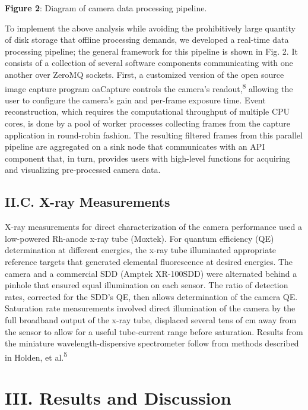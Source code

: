 \textbf{Figure 2}: Diagram of camera data processing pipeline.
\bigbreak


To implement the above analysis while avoiding the prohibitively large
quantity of disk storage that offline processing demands, we developed a
real-time data processing pipeline; the general framework for this
pipeline is shown in Fig. 2. It consists of a collection of several
software components communicating with one another over ZeroMQ sockets.
First, a customized version of the open source image capture program
oaCapture controls the camera's readout,\textsuperscript{8} allowing the
user to configure the camera's gain and per-frame exposure time. Event
reconstruction, which requires the computational throughput of multiple
CPU cores, is done by a pool of worker processes collecting frames from
the capture application in round-robin fashion. The resulting filtered
frames from this parallel pipeline are aggregated on a sink node that
communicates with an API component that, in turn, provides users with
high-level functions for acquiring and visualizing pre-processed camera
data.

\FloatBarrier

\subsection{II.C. X-ray Measurements}

X-ray measurements for direct characterization of the camera performance
used a low-powered Rh-anode x-ray tube (Moxtek). For quantum efficiency
(QE) determination at different energies, the x-ray tube illuminated
appropriate reference targets that generated elemental fluorescence at
desired energies. The camera and a commercial SDD (Amptek XR-100SDD)
were alternated behind a pinhole that ensured equal illumination on each
sensor. The ratio of detection rates, corrected for the SDD's QE, then
allows determination of the camera QE. Saturation rate measurements
involved direct illumination of the camera by the full broadband output
of the x-ray tube, displaced several tens of cm away from the sensor to
allow for a useful tube-current range before saturation. Results from
the miniature wavelength-dispersive spectrometer follow from methods
described in Holden, et al.\textsuperscript{5}

\section{III. Results and Discussion}

